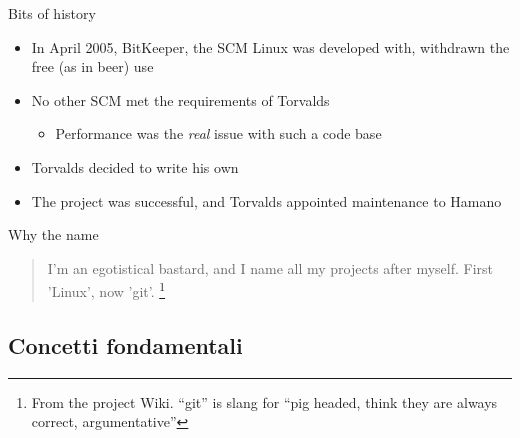 \documentclass[presentation]{beamer}
\begin{document}
\begin{frame}[fragile]{Bits of history}
	\begin{itemize}
		\item In April 2005, BitKeeper, the SCM Linux was developed with, withdrawn the free (as in 
beer) use
		\item No other SCM met the requirements of Torvalds
		\begin{itemize}
			\item Performance was the \textit{real} issue with such a code base
		\end{itemize}
		\item Torvalds decided to write his own
		\item The project was successful, and Torvalds appointed maintenance to Hamano
	\end{itemize}
	\begin{block}{Why the name}
		\begin{quote}
			I'm an egotistical bastard, and I name all my projects after myself. First 'Linux', now 
'git'. \footnote{\tiny{From the project Wiki. ``git'' is slang for ``pig headed, think they are 
always correct, argumentative''}}
			\begin{flushright}
			\end{flushright}
		\end{quote}
	\end{block}
\end{frame}

\subsection{Concetti fondamentali}
\end{document}
